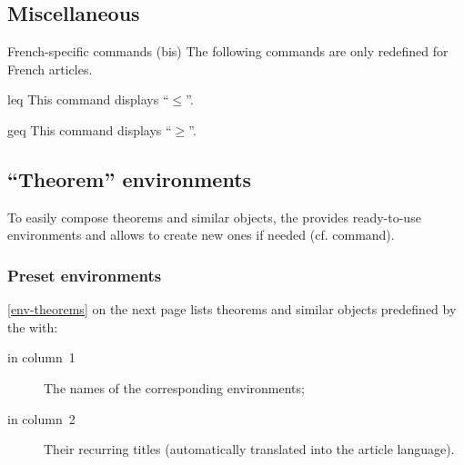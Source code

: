\documentclass[english,nolocaltoc]{nwejmart}
\newtheorem[style=definition]{fact}
\newtheorem[title=experience]{experience}
\newtheorem[title-plural=rings]{ring}
\newtheorem[title=ideal,title-plural=ideals]{ideal}
\begin{document}
\subsection{Miscellaneous}

\begin{dbremark}{French-specific commands (bis)}{}
  The following commands are only redefined for French articles.
\end{dbremark}

\begin{docCommand}{leq}{}
  This command displays \enquote{$\leqslant$}.
\end{docCommand}
\begin{docCommand}{geq}{}
  This command displays \enquote{$\geqslant$}.
\end{docCommand}

\subsection{\enquote{Theorem} environments}

To easily compose theorems and similar objects, the 
\nwejmauthorcl{} provides ready-to-use environments and allows to
create new ones if needed (cf.  command).

\subsubsection{Preset environments}
\label{sec:envir-de-type}

\vref{env-theorems} on the next page lists  theorems and similar
objects predefined by the
\nwejmauthorcl{} with:
\begin{description}
\item[in column~1] The names of the corresponding environments;
\item[in column~2] Their recurring titles (automatically translated into
  the article language).
\end{description}
\end{document}
